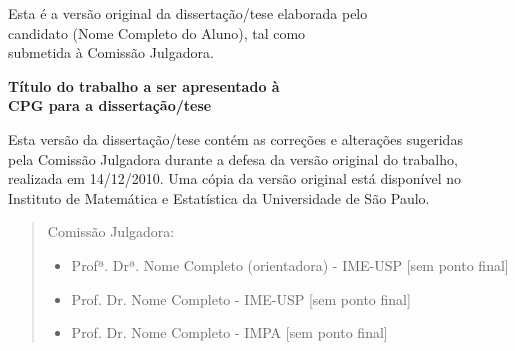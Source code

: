 \documentclass[11pt,twoside,a4paper]{book}
\theoremstyle{note}
\begin{document}
    \vskip 2cm

    \begin{flushright}
	Esta é a versão original da dissertação/tese elaborada pelo\\
	candidato (Nome Completo do Aluno), tal como \\
	submetida à Comissão Julgadora.
    \end{flushright}

\pagebreak


%
%
%
%
\newpage
\thispagestyle{empty}
    \begin{center}
        \vspace*{2.3 cm}
        \textbf{\Large{Título do trabalho a ser apresentado à \\
        CPG para a dissertação/tese}}\\
        \vspace*{2 cm}
    \end{center}

    \vskip 2cm

    \begin{flushright}
	Esta versão da dissertação/tese contém as correções e alterações sugeridas\\
	pela Comissão Julgadora durante a defesa da versão original do trabalho,\\
	realizada em 14/12/2010. Uma cópia da versão original está disponível no\\
	Instituto de Matemática e Estatística da Universidade de São Paulo.

    \vskip 2cm

    \end{flushright}
    \vskip 4.2cm

    \begin{quote}
    \noindent Comissão Julgadora:
    
    \begin{itemize}
		\item Profª. Drª. Nome Completo (orientadora) - IME-USP [sem ponto final]
		\item Prof. Dr. Nome Completo - IME-USP [sem ponto final]
		\item Prof. Dr. Nome Completo - IMPA [sem ponto final]
    \end{itemize}
      
    \end{quote}
\pagebreak
\end{document}
